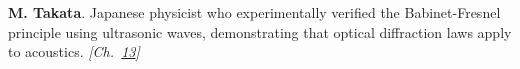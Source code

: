 \textbf{M. Takata}. Japanese physicist who experimentally verified the Babinet-Fresnel principle using ultrasonic waves, demonstrating that optical diffraction laws apply to acoustics. \emph{[Ch.~\hyperref[ch:poissonsspot]{13}]}


